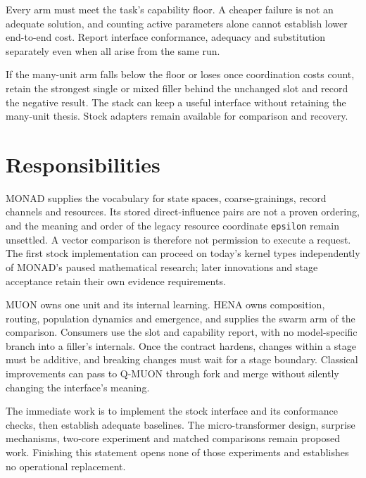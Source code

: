 Every arm must meet the task's capability floor. A cheaper failure is not an adequate solution, and counting active parameters alone cannot establish lower end-to-end cost. Report interface conformance, adequacy and substitution separately even when all arise from the same run.

If the many-unit arm falls below the floor or loses once coordination costs count, retain the strongest single or mixed filler behind the unchanged slot and record the negative result. The stack can keep a useful interface without retaining the many-unit thesis. Stock adapters remain available for comparison and recovery.

\section{Responsibilities}

MONAD supplies the vocabulary for state spaces, coarse-grainings, record channels and resources. Its stored direct-influence pairs are not a proven ordering, and the meaning and order of the legacy resource coordinate \texttt{epsilon} remain unsettled. A vector comparison is therefore not permission to execute a request. The first stock implementation can proceed on today's kernel types independently of MONAD's paused mathematical research; later innovations and stage acceptance retain their own evidence requirements.

MUON owns one unit and its internal learning. HENA owns composition, routing, population dynamics and emergence, and supplies the swarm arm of the comparison. Consumers use the slot and capability report, with no model-specific branch into a filler's internals. Once the contract hardens, changes within a stage must be additive, and breaking changes must wait for a stage boundary. Classical improvements can pass to Q-MUON through fork and merge without silently changing the interface's meaning.

The immediate work is to implement the stock interface and its conformance checks, then establish adequate baselines. The micro-transformer design, surprise mechanisms, two-core experiment and matched comparisons remain proposed work. Finishing this statement opens none of those experiments and establishes no operational replacement.

